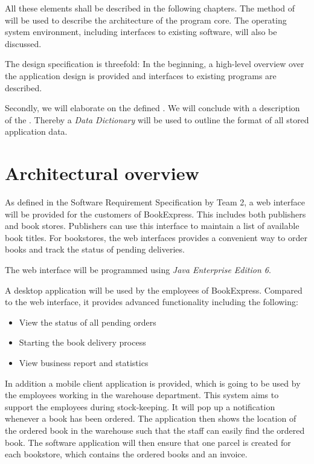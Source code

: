 All these elements shall be described in the following chapters. The method of  will be used to describe the architecture of the program core. The operating system environment, including interfaces to existing software, will also be discussed.

The design specification is threefold: In the beginning, a high-level overview over the application design is provided and interfaces to existing programs are described.

Secondly, we will elaborate on the defined . We will conclude with a description of the . Thereby a \emph{Data Dictionary} will be used to outline the format of all stored application data.
\newpage
\chapter{Architectural overview}
As defined in the Software Requirement Specification by Team 2, a web interface will be provided for the customers of BookExpress. This includes both publishers and book stores. Publishers can use this interface to maintain a list of available book titles. For bookstores, the web interfaces provides a convenient way to order books and track the status of pending deliveries.

The web interface will be programmed using \emph{Java Enterprise Edition 6}.

A desktop application will be used by the employees of BookExpress. Compared to the web interface, it provides advanced functionality including the following:
\begin{itemize}
\item View the status of all pending orders
\item Starting the book delivery process
\item View business report and statistics
\end{itemize}

In addition a mobile client application is provided, which is going to be used by the employees working in the warehouse department. This system aims to support the employees during stock-keeping. It will pop up a notification whenever a book has been ordered. The application then shows the location of the ordered book in the warehouse such that the staff can easily find the ordered book. The software application will then ensure that one parcel is created for each bookstore, which contains the ordered books and an invoice.

